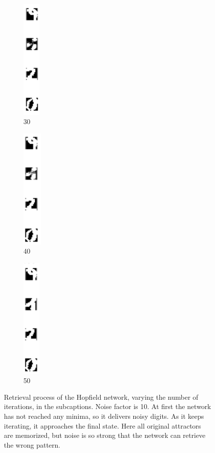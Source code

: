 \documentclass[a4paper, 10pt]{article}
\begin{document}
\begin{figure}[h]
    \begin{subfigure}[c]{0.07\linewidth}
      \includegraphics[width=\linewidth,height=6cm]{lab2/digits/col_n10i30.png}
      \caption{30}
    \end{subfigure}
    \hfill
    \begin{subfigure}[c]{0.07\linewidth}
      \includegraphics[width=\linewidth,height=6cm]{lab2/digits/col_n10i40.png}
      \caption{40}
    \end{subfigure}
    \hfill
    \begin{subfigure}[c]{0.07\linewidth}
      \includegraphics[width=\linewidth,height=6cm]{lab2/digits/col_n10i50.png}
      \caption{50}
    \end{subfigure}
    \caption{Retrieval process of the Hopfield network, varying the number
      of iterations, in the subcaptions. Noise factor is 10. 
      At first the network has not reached
      any minima, so it delivers noisy digits. As it keeps iterating, it approaches
      the final state. Here all original attractors are memorized, but noise is so 
      strong that the network can retrieve the wrong pattern.}
    \label{fig:l2_noisy}
  \end{figure}
\end{document}

